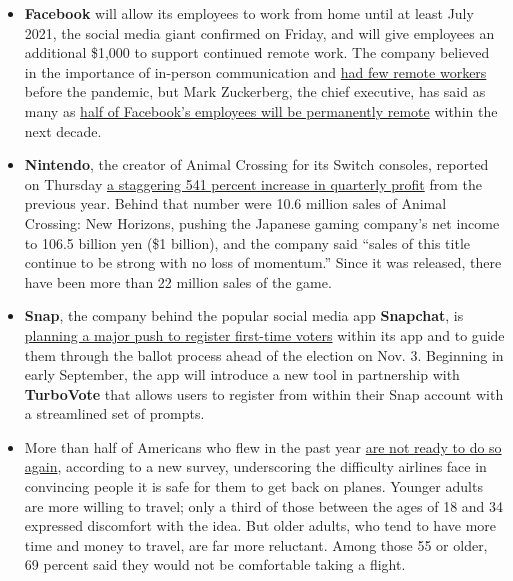 \begin{itemize}
\item
  \textbf{Facebook} will allow its employees to work from home until at
  least July 2021, the social media giant confirmed on Friday, and will
  give employees an additional \$1,000 to support continued remote work.
  The company believed in the importance of in-person communication and
  \href{https://www.nytimes3xbfgragh.onion/2020/03/24/technology/virus-facebook-usage-traffic.html}{had
  few remote workers} before the pandemic, but Mark Zuckerberg, the
  chief executive, has said as many as
  \href{https://www.nytimes3xbfgragh.onion/2020/05/21/technology/facebook-remote-work-coronavirus.html}{half
  of Facebook's employees will be permanently remote} within the next
  decade.
\item
  \textbf{Nintendo}, the creator of Animal Crossing for its Switch
  consoles, reported on Thursday
  \href{https://www.nytimes3xbfgragh.onion/2020/08/06/business/everyones-lockdown-obsession-with-animal-crossing-lifts-nintendos-profits-to-1-billion.html}{a
  staggering 541 percent increase in quarterly profit} from the previous
  year. Behind that number were 10.6 million sales of Animal Crossing:
  New Horizons, pushing the Japanese gaming company's net income to
  106.5 billion yen (\$1 billion), and the company said ``sales of this
  title continue to be strong with no loss of momentum.'' Since it was
  released, there have been more than 22 million sales of the game.
\item
  \textbf{Snap}, the company behind the popular social media app
  \textbf{Snapchat}, is
  \href{https://www.nytimes3xbfgragh.onion/2020/08/06/business/snap-will-make-a-major-effort-to-register-first-time-voters.html}{planning
  a major push to register first-time voters} within its app and to
  guide them through the ballot process ahead of the election on Nov. 3.
  Beginning in early September, the app will introduce a new tool in
  partnership with \textbf{TurboVote} that allows users to register from
  within their Snap account with a streamlined set of prompts.
\item
  More than half of Americans who flew in the past year
  \href{https://www.nytimes3xbfgragh.onion/2020/08/06/business/a-majority-of-travelers-are-not-willing-to-get-on-planes-a-new-survey-shows.html}{are
  not ready to do so again}, according to a new survey, underscoring the
  difficulty airlines face in convincing people it is safe for them to
  get back on planes. Younger adults are more willing to travel; only a
  third of those between the ages of 18 and 34 expressed discomfort with
  the idea. But older adults, who tend to have more time and money to
  travel, are far more reluctant. Among those 55 or older, 69 percent
  said they would not be comfortable taking a flight.
\end{itemize}

